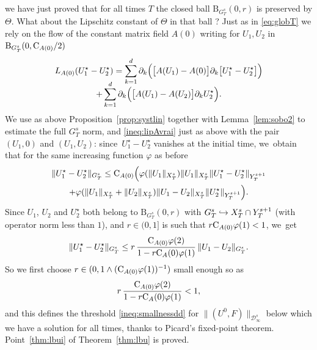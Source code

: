 \documentclass[JEP,XML,SOM,Unicode,published]{cedram}
\newcommand\hto{\mathrel{\lhook\joinrel\to}}
\theoremstyle{definition}
\newcommand\B{\mathrm{B}}
\let\ffi\varphi
\begin{document}
we have just proved that for all times $T$ the closed ball $\B_{G_T^s}(0,r)$ is preserved by $\Theta$. What about the Lipschitz constant of $\Theta$ in that ball ? Just as in \eqref{eq:globT} we rely on the flow of the constant matrix field $A(0)$ writing for $U_1,U_2$ in $\B_{G_T^s}(0,\textnormal{C}_{A(0)}/2)$\vspace*{-5pt}
\begin{multline*}
L_{A(0)}(U_1^\star-U_2^\star) = \sum_{k=1}^d \partial_k\Bigl(\bigl[A(U_1)-A(0)\bigr]\partial_k \bigl[U_1^\star-U_2^\star\bigr]\Bigr) \\[-8pt]
+ \sum_{k=1}^d \partial_k\Bigl(\bigl[A(U_1)-A(U_2)\bigr]\partial_k U_2^\star\Bigr).
\end{multline*}
We use as above Proposition~\ref{prop:systlin} together with Lemma~\ref{lem:sobo2} to estimate the full $G_T^s$ norm, and \eqref{ineq:lipAvrai} just as above with the pair $(U_1,0)$ and $(U_1,U_2)$: since~$U_1^\star-U_2^\star$ vanishes at the initial time, we~obtain that for the same increasing function $\ffi$ as before\vspace*{-5pt}
\begin{multline*}
\|U_1^\star-U_2^\star\|_{G_T^s}\leq \textnormal{C}_{A(0)} \Bigl(\ffi(\|U_1\|_{X_T^s})\|U_1\|_{X_T^s}\|U_1^\star-U_2^\star\|_{Y_T^{s+1}} \\
+ \ffi(\|U_1\|_{X_T^s}+\|U_2\|_{X_T^s})\|U_1-U_2\|_{X_T^s}\|U_2^\star\|_{Y_T^{s+1}}\Bigr).
\end{multline*}
Since $U_1$, $U_2$ and $U_2^\star$ both belong to $\B_{G_T^s}(0,r)$ with $G_T^s\hto X_T^s\cap Y_T^{s+1}$ (with operator norm less than $1$), and $r\in(0,1]$ is such that $r\textnormal{C}_{A(0)}\ffi(1)<1$, we~get
\[
\|U_1^\star-U_2^\star\|_{G_T^s} \leq r\,\frac{\textnormal{C}_{A(0)}\ffi(2)}{1-r\textnormal{C}_A(0)\ffi(1)}\, \|U_1-U_2\|_{G_T^s}.
\]
So we first choose $r\in(0,1\wedge(\textnormal{C}_{A(0)}\ffi(1))^{-1})$ small enough so as
\[
r\,\frac{\textnormal{C}_{A(0)}\ffi(2)}{1-r\textnormal{C}_A(0)\ffi(1)}<1,
\]
and this defines the threshold \eqref{ineq:smallnessdd} for $ \| (U^0,F)\| _{\mathcal D_\infty^{s}}$ below which we have a solution for all times, thanks to Picard's fixed-point theorem. Point~\eqref{thm:lbui} of Theorem~\ref{thm:lbu} is proved.
\end{document}
